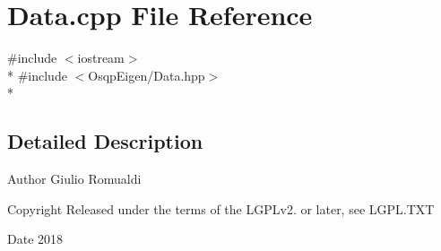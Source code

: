 \section{Data.\+cpp File Reference}
\label{Data_8cpp}
{\ttfamily \#include $<$iostream$>$}\\*
{\ttfamily \#include $<$Osqp\+Eigen/\+Data.\+hpp$>$}\\*


\subsection{Detailed Description}
\begin{DoxyAuthor}{Author}
Giulio Romualdi 
\end{DoxyAuthor}
\begin{DoxyCopyright}{Copyright}
Released under the terms of the L\+G\+P\+Lv2. or later, see L\+G\+P\+L.\+T\+XT 
\end{DoxyCopyright}
\begin{DoxyDate}{Date}
2018 
\end{DoxyDate}
